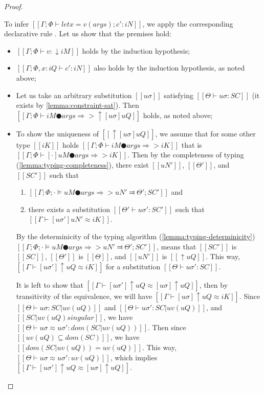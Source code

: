 \begin{proof}
\begin{caseof}
        To infer $[[Γ ; Φ ⊢ let x = v(args) ; c' : iN ]]$, 
        we apply the corresponding 
        declarative rule .
        Let us show that the premises hold:
        \begin{itemize}
            \item $[[Γ; Φ ⊢ v : ↓iM]]$ holds by the induction hypothesis;
            \item $[[Γ; Φ, x:iQ ⊢ c' : iN]]$ also holds by the induction hypothesis, as noted above;
            \item Let us take an arbitrary substitution $[[uσ]]$ 
                satisfying $[[Θ ⊢ uσ : SC]]$ (it exists by \cref{lemma:constraint-sat}).
                Then $[[Γ; Φ ⊢ iM ● args ⇒> ↑[uσ]uQ ]]$ holds, as noted above;
            \item To show the uniqueness of $[[↑[uσ]uQ]]$,
                we assume that for some other type $[[iK]]$ 
                holds $[[Γ; Φ ⊢ iM ● args ⇒> iK ]]$
                that is $[[Γ; Φ ⊢ [·]uM ● args ⇒> iK ]]$.
                Then by the completeness of typing 
                (\cref{lemma:typing-completeness}),
                there exist $[[uN']]$, $[[Θ']]$, and $[[SC']]$ such that
                \begin{enumerate}
                    \item $[[ Γ; Φ; · ⊨ uM ● args ⇒> uN' ⫤ Θ'; SC' ]]$ and
                    \item there exists a substitution $[[Θ' ⊢ uσ' : SC']]$ such that
                    $[[Γ ⊢ [uσ']uN' ≈ iK]]$.
                \end{enumerate}
            By the determinicity of the typing algorithm (\cref{lemma:typing-determinicity})
            $[[ Γ; Φ; · ⊨ uM ● args ⇒> uN' ⫤ Θ'; SC' ]]$,
            means that $[[SC']]$ is $[[SC]]$, $[[Θ']]$ is $[[Θ]]$, and $[[uN']]$ is
            $[[↑uQ]]$. 
            This way, $[[Γ ⊢ [uσ']↑uQ ≈ iK]]$ for a substitution 
            $[[Θ ⊢ uσ' : SC]]$. 

            It is left to show that $[[Γ ⊢ [uσ']↑uQ ≈ [uσ]↑uQ]]$, 
            then by transitivity of the equivalence, we will have $[[Γ ⊢ [uσ]↑uQ ≈ iK]]$.
            Since $[[Θ ⊢ uσ : SC|uv(uQ)]]$ and $[[Θ ⊢ uσ' : SC|uv(uQ)]]$, 
            and $[[SC|uv(uQ) singular]]$, we have $[[Θ ⊢ uσ ≈ uσ' : dom(SC|uv(uQ))]]$.
            Then since $[[uv(uQ) ⊆ dom(SC)]]$, we have $[[dom(SC|uv(uQ)) = uv(uQ)]]$.
            This way, $[[Θ ⊢ uσ ≈ uσ' : uv(uQ)]]$, which implies
            $[[Γ ⊢ [uσ']↑uQ ≈ [uσ]↑uQ]]$. 
        \end{itemize}


\end{caseof}
\end{proof}
